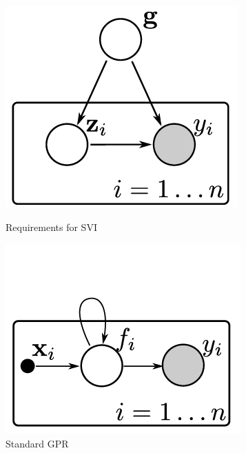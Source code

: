 \documentclass[12pt,a4paper,oneside]{book}
\begin{document}
\begin{figure}[!htb]
   \begin{minipage}{0.31\textwidth}
     \centering
     \includegraphics[width=1.1\linewidth]{plot_variational_inference}
     \caption{Requirements for SVI}\label{fig:var_1.1}
   \end{minipage}\hfill
   \begin{minipage}{0.31\textwidth}
     \centering
     \includegraphics[width=1.1\linewidth]{plot_GPR_regression}
     \caption{Standard GPR}\label{fig:var_1.2}

\end{minipage}
\end{figure}
\end{document}
